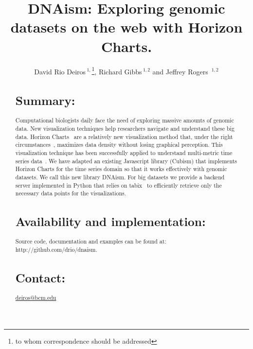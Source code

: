 \documentclass{bioinfo}
\begin{document}

\title[short Title]{DNAism: Exploring genomic datasets on the web with Horizon Charts. }

\author[Sample \textit{et~al}]{David Rio Deiros\,$^{1,}$\footnote{to whom correspondence should be addressed},
Richard Gibbs\,$^{1,2}$ and Jeffrey Rogers\, $^{1,2}$}

\address{$^{1}$Human Genome Sequencing Center, Baylor College of Medicine, Houston, TX.\\
$^{2}$Department of Molecular and Human Genetics, Baylor College of Medicine, Houston, TX.}



\maketitle

\begin{abstract}

\section{Summary:}

Computational biologists daily face the need of exploring massive amounts of
genomic data. New visualization techniques help researchers navigate and
understand these big data. Horizon Charts~\citep{time-in-the-horizon} are a
relatively new visualization method that, under the right
circumstances~\citep{2009-horizon}, maximizes data density without losing
graphical perception. This visualization technique has been successfully
applied to understand multi-metric time series
data~\citep{time-in-the-horizon}. We have adapted an existing Javascript
library (Cubism\citep{cubism}) that implements
Horizon Charts for the time series domain so that it works effectively with
genomic datasets. We call this new library DNAism. For big datasets we provide
a backend server implemented in Python that relies on tabix~\citep{tabix-li} to
efficiently retrieve only the necessary data points for the visualizations.

\section{Availability and implementation:}
Source code, documentation and examples can be found at:
http://github.com/drio/dnaism.

\section{Contact:} \href{deiros@bcm.edu}{deiros@bcm.edu}
\end{abstract}
\end{document}
